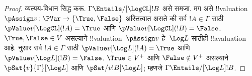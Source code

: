 \documentclass[../../../include/open-logic-section]{subfiles}
\begin{document}
\begin{proof}
  व्यत्यय-विधान सिद्ध करू. $\Gamma \Entails/[\LogCL] !B$
  असे समजा. मग असे !!{valuation}~$\pAssign v\colon \PVar \to
  \{\True, \False\}$ अस्तित्वात असते की सर्व
  $!A \in \Gamma$ साठी $\pValue v[\LogCL](!A) = \True$
  आणि $\pValue v[\LogCL](!B) = \False$.
  $\True, \False \in V$ असल्याने !!{valuation}~$\pAssign v$
  हे~$\Log L$ साठीही !!a{valuation} आहे.
   नुसार सर्व $!A \in \Gamma$ साठी
  $\pValue v[\Log L](!A) = \True$ आणि
  $\pValue v[\Log L](!B) = \False$.
  $\True \in V^+$ आणि $\False \notin V^+$ असल्याने
  $\pSat{v}{\Gamma}[\Log L]$ आणि
  $\pSat/{v}{!B}[\Log L]$; म्हणजे
  $\Gamma \Entails/[\Log L] !B$.
\end{proof}
\end{document}
